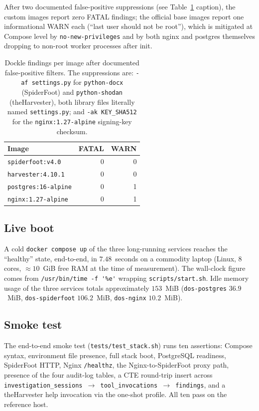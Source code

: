 \documentclass[conference,a4paper,10pt]{IEEEtran}
\begin{document}
After two documented false-positive suppressions
(see Table~\ref{tab:dockle} caption), the custom images report zero
FATAL findings; the official base images report one informational
WARN each (``last user should not be root''), which is mitigated at
Compose level by \verb|no-new-privileges| and by both nginx and
postgres themselves dropping to non-root worker processes after
init.

\begin{table}[!t]
\caption{Dockle findings per image after documented false-positive
filters. The suppressions are: \texttt{-af settings.py} for
\texttt{python-docx} (SpiderFoot) and \texttt{python-shodan}
(theHarvester), both library files literally named
\texttt{settings.py}; and \texttt{-ak KEY\_SHA512} for the
\texttt{nginx:1.27-alpine} signing-key checksum.}
\label{tab:dockle}
\centering
\footnotesize
\begin{tabularx}{\columnwidth}{Xrr}
\toprule
\textbf{Image} & \textbf{FATAL} & \textbf{WARN} \\
\midrule
\texttt{spiderfoot:v4.0}    & 0 & 0 \\
\texttt{harvester:4.10.1}   & 0 & 0 \\
\texttt{postgres:16-alpine} & 0 & 1 \\
\texttt{nginx:1.27-alpine}  & 0 & 1 \\
\bottomrule
\end{tabularx}
\end{table}

\subsection{Live boot}

A cold \verb|docker compose up| of the three long-running services
reaches the ``healthy'' state, end-to-end, in
$7.48$~seconds on a commodity laptop (Linux, 8 cores, $\approx 10$~GiB
free RAM at the time of measurement). The wall-clock figure comes
from \verb|/usr/bin/time -f '%e'| wrapping
\verb|scripts/start.sh|. Idle memory usage of the three services
totals approximately $153$~MiB
(\texttt{dos-postgres} $36.9$~MiB, \texttt{dos-spiderfoot}
$106.2$~MiB, \texttt{dos-nginx} $10.2$~MiB).

\subsection{Smoke test}

The end-to-end smoke test (\texttt{tests/test\_stack.sh}) runs ten
assertions: Compose syntax, environment file presence, full stack
boot, PostgreSQL readiness, SpiderFoot HTTP, Nginx \texttt{/healthz},
the Nginx-to-SpiderFoot proxy path, presence of the four audit-log
tables, a CTE round-trip insert across
\texttt{investigation\_sessions \(\rightarrow\) tool\_invocations
\(\rightarrow\) findings}, and a theHarvester help invocation via
the one-shot profile. All ten pass on the reference host.
\end{document}
